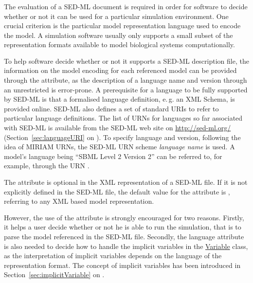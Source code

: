 \subsubsection{}
\label{sec:language}
The evaluation of a SED-ML document is required in order for software to decide whether or not it can be used for a particular simulation environment. One crucial criterion is the particular model representation language used to encode the model. A simulation software usually only supports a small subset of the representation formats available to model biological systems computationally. 

To help  software decide whether or not it supports a SED-ML description file, the information on the model encoding for each referenced model can be provided through the  attribute, as the description of a language name and version through an unrestricted  is error-prone. 
A prerequisite for a language to be fully supported by SED-ML is that a formalised language definition, e.\,g. an XML Schema, is provided online. SED-ML also defines a set of standard URIs to refer to particular language definitions. 
The list of URNs for languages so far associated with SED-ML is available from the SED-ML web site on \url{http://sed-ml.org/}  (Section~\ref{sec:languageURI} on ). 
To specify language and version, following the idea of MIRIAM URNs, the SED-ML URN scheme \emph{language name} is used. A model's language being ``SBML Level 2 Version 2'' can be referred to, for example, through the URN .

The  attribute is optional in the XML representation of a SED-ML file. 
If it is not explicitly defined in the SED-ML file, the default value for the  attribute is , referring to any XML based model representation. 

However, the use of the  attribute is strongly encouraged for two reasons. 
Firstly, it helps a user decide whether or not he is able to run the simulation, that is to parse the model referenced in the SED-ML file. 
Secondly, the language attribute is also needed to decide how to handle the implicit variables in the \hyperref[class:variable]{Variable} class, as the interpretation of implicit variables depends on the language of the representation format. The concept of implicit variables has been introduced in Section~\ref{sec:implicitVariable} on .




